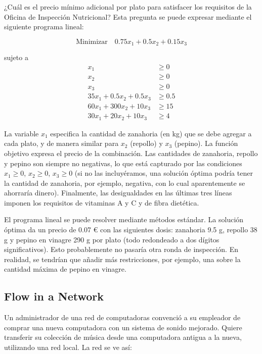 \documentclass{article}
\begin{document}
¿Cuál es el precio mínimo adicional por plato para satisfacer los requisitos de la Oficina de Inspección Nutricional? Esta pregunta se puede expresar mediante el siguiente programa lineal:

\begin{equation}
\text{Minimizar} \quad 0.75x_1 + 0.5x_2 + 0.15x_3
\end{equation}

sujeto a
\[
\begin{aligned}
x_1 &\geq 0 \\
x_2 &\geq 0 \\
x_3 &\geq 0 \\
35x_1 + 0.5x_2 + 0.5x_3 &\geq 0.5 \\
60x_1 + 300x_2 + 10x_3 &\geq 15 \\
30x_1 + 20x_2 + 10x_3 &\geq 4
\end{aligned}
\]

La variable \(x_1\) especifica la cantidad de zanahoria (en kg) que se debe agregar a cada plato, y de manera similar para \(x_2\) (repollo) y \(x_3\) (pepino). La función objetivo expresa el precio de la combinación. Las cantidades de zanahoria, repollo y pepino son siempre no negativas, lo que está capturado por las condiciones \(x_1 \geq 0\), \(x_2 \geq 0\), \(x_3 \geq 0\) (si no las incluyéramos, una solución óptima podría tener la cantidad de zanahoria, por ejemplo, negativa, con lo cual aparentemente se ahorraría dinero). Finalmente, las desigualdades en las últimas tres líneas imponen los requisitos de vitaminas A y C y de fibra dietética.

El programa lineal se puede resolver mediante métodos estándar. La solución óptima da un precio de 0.07 € con las siguientes dosis: zanahoria 9.5 g, repollo 38 g y pepino en vinagre 290 g por plato (todo redondeado a dos dígitos significativos). Esto probablemente no pasaría otra ronda de inspección. En realidad, se tendrían que añadir más restricciones, por ejemplo, una sobre la cantidad máxima de pepino en vinagre.
\newpage 

\subsection{Flow in a Network}
Un administrador de una red de computadoras convenció a su empleador de comprar una nueva computadora con un sistema de sonido mejorado. Quiere transferir su colección de música desde una computadora antigua a la nueva, utilizando una red local. La red se ve así:
\end{document}
